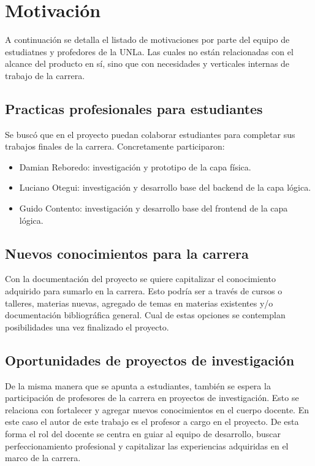 
\section{Motivación}
A continuación se detalla el listado de motivaciones por parte del equipo de estudiatnes y profedores de la UNLa. Las cuales no están relacionadas con el alcance del producto en sí, sino que con necesidades y verticales internas de trabajo de la carrera. 

\subsection{Practicas profesionales para estudiantes}
Se buscó que en el proyecto puedan colaborar estudiantes para completar sus trabajos finales de la carrera. Concretamente participaron:
\begin{itemize}
\item Damian Reboredo: investigación y prototipo de la capa física.
\item Luciano Otegui: investigación y desarrollo base del backend de la capa lógica.
\item Guido Contento: investigación y desarrollo base del frontend de la capa lógica.
\end{itemize}

\subsection{Nuevos conocimientos para la carrera}
Con la documentación del proyecto se quiere capitalizar el conocimiento adquirido para sumarlo en la carrera. Esto podría ser a través de cursos o talleres, materias nuevas, agregado de temas en materias existentes y/o documentación bibliográfica general. Cual de estas opciones se contemplan posibilidades una vez finalizado el proyecto.

\subsection{Oportunidades de proyectos de investigación}
De la misma manera que se apunta a estudiantes, también se espera la participación de profesores de la carrera en proyectos de investigación. Esto se relaciona con fortalecer y agregar nuevos conocimientos en el cuerpo docente. En este caso el autor de este trabajo es el profesor a cargo en el proyecto. De esta forma el rol del docente se centra en guiar al equipo de desarrollo, buscar perfeccionamiento profesional y capitalizar las experiencias adquiridas en el marco de la carrera.

